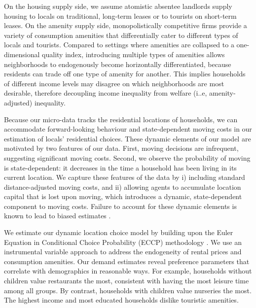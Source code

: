 \documentclass[11pt]{article}
\begin{document}
On the housing supply side, we assume atomistic absentee landlords supply housing to locals on traditional, long-term leases or to tourists on short-term leases. On the amenity supply side, monopolistically competitive firms provide a variety of consumption amenities that differentially cater to different types of locals and tourists. Compared to settings where amenities are collapsed to a one-dimensional quality index, introducing multiple types of amenities allows neighborhoods to endogenously become horizontally differentiated, because residents can trade off one type of amenity for another. This implies households of different income levels may disagree on which neighborhoods are most desirable, therefore decoupling income inequality from welfare (i..e, amenity-adjusted) inequality.

Because our micro-data tracks the residential locations of households, we can accommodate forward-looking behaviour and state-dependent moving costs in our estimation of locals' residential choices. These dynamic elements of our model are motivated by two features of our data. First, moving decisions are infrequent, suggesting significant moving costs. Second, we observe the probability of moving is state-dependent: it decreases in the time a household has been living in its current location. We capture these features of the data by i) including standard distance-adjusted moving costs, and ii) allowing agents to accumulate location capital that is lost upon moving, which introduces a dynamic, state-dependent component to moving costs. Failure to account for these dynamic elements is known to lead to biased estimates \citep{bayer2016dynamic, traiberman2019occupations}.

We estimate our dynamic location choice model by building upon the Euler Equation in Conditional Choice Probability (ECCP) methodology \citep{aguirregabiria2013euler, scott2013dynamic, kalouptsidi2021linear}. We use an instrumental variable approach to address the endogeneity of rental prices and consumption amenities. Our demand estimates reveal preference parameters that correlate with demographics in reasonable ways. For example, households without children value restaurants the most, consistent with having the most leisure time among all groups. By contrast, households with children value nurseries the most. The highest income and most educated households dislike touristic amenities.
\end{document}
